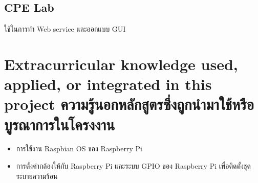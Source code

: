 \subsection{CPE Lab}
ใช้ในการทำ Web service และออกแบบ GUI

\section{\ifenglish%
Extracurricular knowledge used, applied, or integrated in this project
\else%
ความรู้นอกหลักสูตรซึ่งถูกนำมาใช้หรือบูรณาการในโครงงาน
\fi
}
\begin{itemize}
  \item การใช้งาน Raspbian OS ของ Raspberry Pi
  \item การตั้งค่ากล้องให้กับ Raspberry Pi และระบบ GPIO ของ Raspberry Pi เพื่อติดตั้งชุดระบายความร้อน
\end{itemize}







